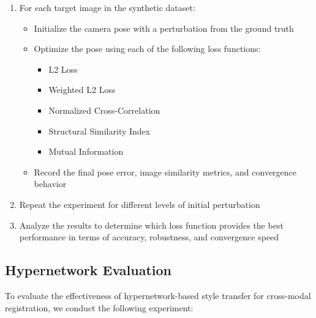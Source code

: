 \begin{enumerate}
    \item For each target image in the synthetic dataset:
        \begin{itemize}
            \item Initialize the camera pose with a perturbation from the ground truth
            \item Optimize the pose using each of the following loss functions:
                \begin{itemize}
                    \item L2 Loss
                    \item Weighted L2 Loss
                    \item Normalized Cross-Correlation
                    \item Structural Similarity Index
                    \item Mutual Information
                \end{itemize}
            \item Record the final pose error, image similarity metrics, and convergence behavior
        \end{itemize}
    \item Repeat the experiment for different levels of initial perturbation
    \item Analyze the results to determine which loss function provides the best performance in terms of accuracy, robustness, and convergence speed
\end{enumerate}

\subsection{Hypernetwork Evaluation}
To evaluate the effectiveness of hypernetwork-based style transfer for cross-modal registration, we conduct the following experiment:

